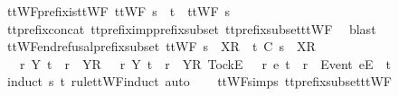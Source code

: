 \endisatagproof
{\isafoldproof}%
%
\isadelimproof
\isanewline
%
\endisadelimproof
\isanewline
{}\isamarkupfalse%
\ ttWF{\isacharunderscore}prefix{\isacharunderscore}is{\isacharunderscore}ttWF{\isacharcolon}\ {\isachardoublequoteopen}ttWF\ {\isacharparenleft}s\ {\isacharat}\ t{\isacharparenright}\ {\isasymLongrightarrow}\ ttWF\ s{\isachardoublequoteclose}\isanewline
%
\isadelimproof
\ \ %
\endisadelimproof
%
\isatagproof
{}\isamarkupfalse%
\ tt{\isacharunderscore}prefix{\isacharunderscore}concat\ tt{\isacharunderscore}prefix{\isacharunderscore}imp{\isacharunderscore}prefix{\isacharunderscore}subset\ tt{\isacharunderscore}prefix{\isacharunderscore}subset{\isacharunderscore}ttWF\ \isamarkupfalse%
\ blast%
\endisatagproof
{\isafoldproof}%
%
\isadelimproof
\isanewline
%
\endisadelimproof
\isanewline
{}\isamarkupfalse%
\ ttWF{\isacharunderscore}end{\isacharunderscore}refusal{\isacharunderscore}prefix{\isacharunderscore}subset{\isacharcolon}\ {\isachardoublequoteopen}ttWF\ {\isacharparenleft}s\ {\isacharat}\ {\isacharbrackleft}{\isacharbrackleft}X{\isacharbrackright}\isactrlsub R{\isacharbrackright}{\isacharparenright}\ {\isasymLongrightarrow}\ t\ {\isasymlesssim}\isactrlsub C\ s\ {\isacharat}\ {\isacharbrackleft}{\isacharbrackleft}X{\isacharbrackright}\isactrlsub R{\isacharbrackright}\ {\isasymLongrightarrow}\ \isanewline
\ \ {\isacharparenleft}{\isasymexists}\ r\ Y{\isachardot}\ t\ {\isacharequal}\ r\ {\isacharat}\ {\isacharbrackleft}{\isacharbrackleft}Y{\isacharbrackright}\isactrlsub R{\isacharbrackright}{\isacharparenright}\ {\isasymor}\ {\isacharparenleft}{\isasymexists}\ r\ Y{\isachardot}\ t\ {\isacharequal}\ r\ {\isacharat}\ {\isacharbrackleft}{\isacharbrackleft}Y{\isacharbrackright}\isactrlsub R{\isacharcomma}\ {\isacharbrackleft}Tock{\isacharbrackright}\isactrlsub E{\isacharbrackright}{\isacharparenright}\ {\isasymor}\ {\isacharparenleft}{\isasymexists}\ r\ e{\isachardot}\ t\ {\isacharequal}\ r\ {\isacharat}\ {\isacharbrackleft}{\isacharbrackleft}Event\ e{\isacharbrackright}\isactrlsub E{\isacharbrackright}{\isacharparenright}\ {\isasymor}\ t\ {\isacharequal}\ {\isacharbrackleft}{\isacharbrackright}{\isachardoublequoteclose}\isanewline
%
\isadelimproof
\ \ %
\endisadelimproof
%
\isatagproof
{}\isamarkupfalse%
\ {\isacharparenleft}induct\ s\ t\ rule{\isacharcolon}ttWF{}{\isachardot}induct{\isacharcomma}\ auto{\isacharparenright}\isanewline
\ \ \isamarkupfalse%
\ ttWF{\isachardot}simps{\isacharparenleft}{}{}{\isacharparenright}\ tt{\isacharunderscore}prefix{\isacharunderscore}subset{\isacharunderscore}ttWF\ \isamarkupfalse%
